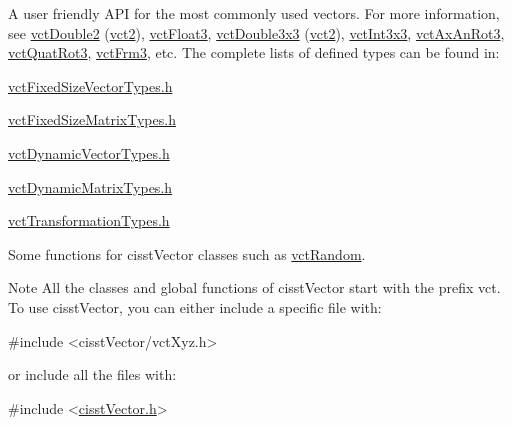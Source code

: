 \begin{DoxyItemize}
\item A user friendly A\+P\+I for the most commonly used vectors. For more information, see \hyperlink{vct_fixed_size_vector_types_8h_afc0fdcc41cbe8b043747612501610812}{vct\+Double2} (\hyperlink{vct_fixed_size_vector_types_8h_a88481ac3c794867ba5e4e92624f0d958}{vct2}), \hyperlink{vct_fixed_size_vector_types_8h_a86116f095b661a1ffb5f630c06ee258d}{vct\+Float3}, \hyperlink{vct_fixed_size_matrix_types_8h_a7278d810c510a7a8ebd38de1c8d80970}{vct\+Double3x3} (\hyperlink{vct_fixed_size_vector_types_8h_a88481ac3c794867ba5e4e92624f0d958}{vct2}), \hyperlink{vct_fixed_size_matrix_types_8h_a59789252579c8ed0c5841af643951107}{vct\+Int3x3}, \hyperlink{vct_transformation_types_8h_ac2733d98f3965180e67f7a21b7ee4582}{vct\+Ax\+An\+Rot3}, \hyperlink{vct_transformation_types_8h_a595c3c83888ed4fb8ae707126efd25e3}{vct\+Quat\+Rot3}, \hyperlink{vct_transformation_types_8h_a81feda0a02c2d1bc26e5553f409fed20}{vct\+Frm3}, etc. The complete lists of defined types can be found in\+: 
\begin{DoxyItemize}
\item \hyperlink{vct_fixed_size_vector_types_8h}{vct\+Fixed\+Size\+Vector\+Types.\+h} 
\item \hyperlink{vct_fixed_size_matrix_types_8h}{vct\+Fixed\+Size\+Matrix\+Types.\+h} 
\item \hyperlink{vct_dynamic_vector_types_8h}{vct\+Dynamic\+Vector\+Types.\+h} 
\item \hyperlink{vct_dynamic_matrix_types_8h}{vct\+Dynamic\+Matrix\+Types.\+h} 
\item \hyperlink{vct_transformation_types_8h}{vct\+Transformation\+Types.\+h} 
\end{DoxyItemize}
\item Some functions for cisst\+Vector classes such as \hyperlink{group__cisst_vector_ga515b69d58d116cfb3465c9bb6b9e05dc}{vct\+Random}.
\end{DoxyItemize}

\begin{DoxyNote}{Note}
All the classes and global functions of cisst\+Vector start with the prefix vct. To use cisst\+Vector, you can either include a specific file with\+: 
\begin{DoxyCode}
\textcolor{preprocessor}{#include <cisstVector/vctXyz.h>}
\end{DoxyCode}
 or include all the files with\+: 
\begin{DoxyCode}
\textcolor{preprocessor}{#include <\hyperlink{cisst_vector_8h}{cisstVector.h}>}
\end{DoxyCode}
 
\end{DoxyNote}



